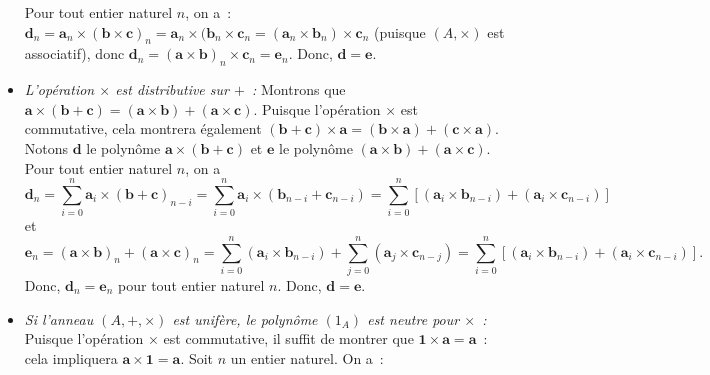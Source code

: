 \begin{itemize}[nosep]
        Pour tout entier naturel $n$, on a : $\mathbf{d}_n = \mathbf{a}_n \times (\mathbf{b} \times \mathbf{c})_n = \mathbf{a}_n \times (\mathbf{b}_n \times \mathbf{c}_n = (\mathbf{a}_n \times \mathbf{b}_n) \times \mathbf{c}_n$ (puisque $(A, \times)$ est associatif), donc $\mathbf{d}_n = (\mathbf{a} \times \mathbf{b})_n \times \mathbf{c}_n = \mathbf{e}_n$.
        Donc, $\mathbf{d} = \mathbf{e}$.
    \item \textit{L'opération $\times$ est distributive sur $+$ :} 
        Montrons que $\mathbf{a} \times (\mathbf{b} + \mathbf{c}) = (\mathbf{a} \times \mathbf{b}) + (\mathbf{a} \times \mathbf{c})$.
        Puisque l'opération $\times$ est commutative, cela montrera également $(\mathbf{b} + \mathbf{c}) \times \mathbf{a} = (\mathbf{b} \times \mathbf{a}) + (\mathbf{c} \times \mathbf{a})$.
        Notons $\mathbf{d}$ le polynôme $\mathbf{a} \times (\mathbf{b} + \mathbf{c})$ et $\mathbf{e}$ le polynôme $(\mathbf{a} \times \mathbf{b}) + (\mathbf{a} \times \mathbf{c})$.
        Pour tout entier naturel $n$, on a 
        \begin{equation*}
            \mathbf{d}_n = \sum_{i=0}^n \mathbf{a}_i \times (\mathbf{b} + \mathbf{c})_{n-i}
                         = \sum_{i=0}^n \mathbf{a}_i \times (\mathbf{b}_{n-i} + \mathbf{c}_{n-i})
                         = \sum_{i=0}^n \left[ (\mathbf{a}_i \times \mathbf{b}_{n-i}) + (\mathbf{a}_i \times \mathbf{c}_{n-i}) \right]
        \end{equation*}
        et
        \begin{equation*}
            \mathbf{e}_n = (\mathbf{a} \times \mathbf{b})_n + (\mathbf{a} \times \mathbf{c})_n
                         = \sum_{i=0}^n  (\mathbf{a}_i \times \mathbf{b}_{n-i}) 
                            + \sum_{j=0}^n (\mathbf{a}_j \times \mathbf{c}_{n-j}) 
                         = \sum_{i=0}^n \left[ (\mathbf{a}_i \times \mathbf{b}_{n-i}) + (\mathbf{a}_i \times \mathbf{c}_{n-i}) \right] .
        \end{equation*}
        Donc, $\mathbf{d}_n = \mathbf{e}_n$ pour tout entier naturel $n$.
        Donc, $\mathbf{d} = \mathbf{e}$.
    \item \textit{Si l'anneau $(A, +, \times)$ est unifère, le polynôme $(1_A)$ est neutre pour $\times$ :}
        Puisque l'opération $\times$ est commutative, il suffit de montrer que $\mathbf{1} \times \mathbf{a} = \mathbf{a}$ : cela impliquera $\mathbf{a} \times \mathbf{1} = \mathbf{a}$.
        Soit $n$ un entier naturel. 
        On a : 
        \begin{equation*}

\end{equation*}
\end{itemize}
